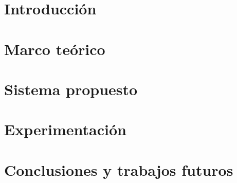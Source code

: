 \documentclass[11pt,a4paper,spanish]{book}
\begin{document}
\frontmatter








\tableofcontents
\listoffigures
\mainmatter

\chapter{Introducción}













\chapter{Marco teórico}

\label{marcoTeorico}







\chapter{Sistema propuesto}

\label{sistemaPropuesto}



\chapter{Experimentación}

\label{experimentacion}



\chapter{Conclusiones y trabajos futuros}



\label{conclucionesYTrabajosFuturos}




\end{document}
